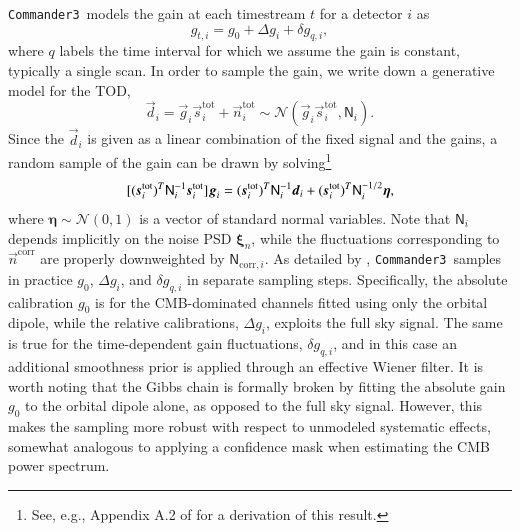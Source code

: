 \documentclass[twocolumn]{../../common/aa}
\def\commanderthree{\texttt{Commander3}}
\newcommand{\dv}[0]{\vec{d}}
\newcommand{\n}[0]{\vec{n}}
\newcommand{\s}[0]{\vec{s}}
\newcommand{\g}[0]{\vec{g}}
\newcommand{\N}[0]{\tens{N}}
\newcommand{\ncorr}{\vec n^\mathrm{corr}}
\begin{document}
\commanderthree\ models the gain at each timestream $t$ for a detector $i$ as
\begin{equation}
	g_{t,i}=g_0+\Delta g_i+\delta g_{q,i},
\end{equation}
where $q$ labels the time interval for which we assume the gain is constant, typically a single scan. In order to sample the gain, we write down a generative model for the TOD,
\begin{equation}
	\dv_i=\g_{i}\s_{i}^\mathrm{tot} +\n_{i}^\mathrm{tot}\sim\mathcal N(\g_i\s_{i}^\mathrm{tot},\mathsf N_i).
\end{equation}
Since the $\dv_i$ is given as a linear combination of the fixed signal and the gains, a random sample of the gain can be drawn by solving\footnote{See, e.g., Appendix A.2 of \citet{bp01} for a derivation of this result.}
\begin{equation}
	\label{eq:gain_gauss_samp}
	[(\s_i^\mathrm{tot})^T\mathsf N_i^{-1}\s_i^\mathrm{tot}]\g_i
	=(\s_i^\mathrm{tot})^T\N^{-1}_i\dv_i
	+(\s_i^\mathrm{tot})^T\N^{-1/2}_i\boldsymbol\eta,
\end{equation}
where $\boldsymbol\eta\sim\mathcal N(0,1)$ is a vector of standard normal variables.
Note that $\mathsf N_i$ depends implicitly on the noise PSD $\boldsymbol \xi_n$, while the fluctuations corresponding to $\ncorr$ are properly downweighted by $\mathsf N_{\mathrm{corr},i}$.
As detailed by \citet{bp07}, \commanderthree\ samples in practice $g_0$, $\Delta g_i$, and $\delta g_{q,i}$ in separate sampling steps. Specifically, the absolute calibration $g_0$ is for the CMB-dominated channels fitted using only the orbital dipole, while the relative calibrations, $\Delta g_i$, exploits the full sky signal. The same is true for the time-dependent gain fluctuations, $\delta g_{q,i}$, and in this case an additional smoothness prior is applied through an effective Wiener filter. It is worth noting that the Gibbs chain is formally broken by fitting the absolute gain $g_0$ to the orbital dipole alone, as opposed to the full sky signal. However, this makes the sampling more robust with respect to unmodeled systematic effects, somewhat analogous to applying a confidence mask when estimating the CMB power spectrum.
\end{document}

